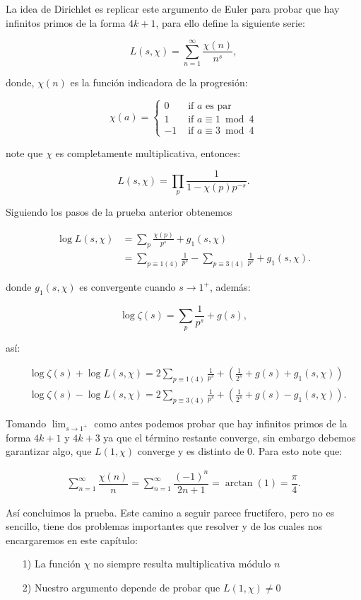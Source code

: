 La idea de Dirichlet es replicar este argumento de Euler para probar que hay infinitos primos de la forma $4k+1$, para ello define la siguiente serie:

$$
L(s, \chi)=\sum_{n=1}^{\infty} \frac{\chi(n)}{n^s},
$$

donde, $\chi(n)$ es la función indicadora de la progresión:

$$
\chi(a)= \begin{cases}0 & \text { if } a \text { es par } \\ 1 & \text { if } a \equiv 1 \bmod 4 \\ -1 & \text { if } a \equiv 3 \bmod 4\end{cases}
$$

note que $\chi$ es completamente multiplicativa, entonces:

$$
L(s, \chi)=\prod_p \frac{1}{1-\chi(p) p^{-s}}.
$$

Siguiendo los pasos de la prueba anterior obtenemos

\begin{align*}
    \log L(s, \chi)&=\sum_p \frac{\chi(p)}{p^s}+g_1(s, \chi)\\
    &=\sum_{p\equiv 1(4)}\frac{1}{p^s}- \sum_{p\equiv 3(4)}\frac{1}{p^s}+g_1(s,\chi)
.\end{align*}

donde $g_1(s,\chi)$ es convergente cuando $s\to 1^{+}$, además:

$$\log \zeta(s)=\sum_p \frac{1}{p^s}+g(s),$$

así:

$$\begin{aligned}
& \log \zeta(s)+\log L(s, \chi)=2 \sum_{p \equiv 1(4)} \frac{1}{p^s}+\left(\frac{1}{2^s}+g(s)+g_1(s, \chi)\right) \\
& \log \zeta(s)-\log L(s, \chi)=2 \sum_{p \equiv 3(4)} \frac{1}{p^s}+\left(\frac{1}{2^s}+g(s)-g_1(s, \chi)\right).
\end{aligned}$$

Tomando $\lim_{s\to 1^{+}}$ como antes podemos probar  que hay infinitos primos de la forma $4k+1$ y $4k+3$ ya que el término restante converge, sin embargo debemos garantizar algo, que $L(1,\chi)$ converge y es distinto de 0. Para esto note  que:

\begin{align*}
    \sum_{n=1}^{\infty}\dfrac{\chi(n)}{n}=\sum_{n=1}^{\infty}\dfrac{(-1)^n}{2n+1}=\arctan(1)=\dfrac{\pi}{4}
.\end{align*}

Así concluimos la prueba. Este camino a seguir parece fructifero, pero no es sencillo, tiene dos problemas importantes que resolver y de los cuales nos encargaremos en este capítulo:

\begin{itemize}
\item[1)] La función $\chi$ no siempre resulta multiplicativa módulo $n$
\item[2)] Nuestro argumento depende de  probar que $L(1,\chi)\neq 0$
\end{itemize}


